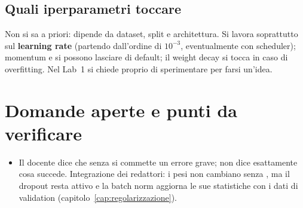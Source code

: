 \subsection{Quali iperparametri toccare}
Non si sa a priori: dipende da dataset, split e architettura. Si lavora soprattutto sul
\textbf{learning rate} (partendo dall'ordine di $10^{-3}$, eventualmente con scheduler); momentum e
 si possono lasciare di default; il weight decay si tocca in caso di overfitting. Nel
Lab~1 si chiede proprio di sperimentare per farsi un'idea.

\section{Domande aperte e punti da verificare}
\begin{verifica}
\begin{itemize}
  \item Il docente dice che senza  si commette un errore grave; non dice
    esattamente cosa succede. Integrazione dei redattori: i pesi non cambiano senza
    , ma il dropout resta attivo e la batch norm aggiorna le sue statistiche
    con i dati di validation (capitolo~\ref{cap:regolarizzazione}).
\end{itemize}
\end{verifica}
